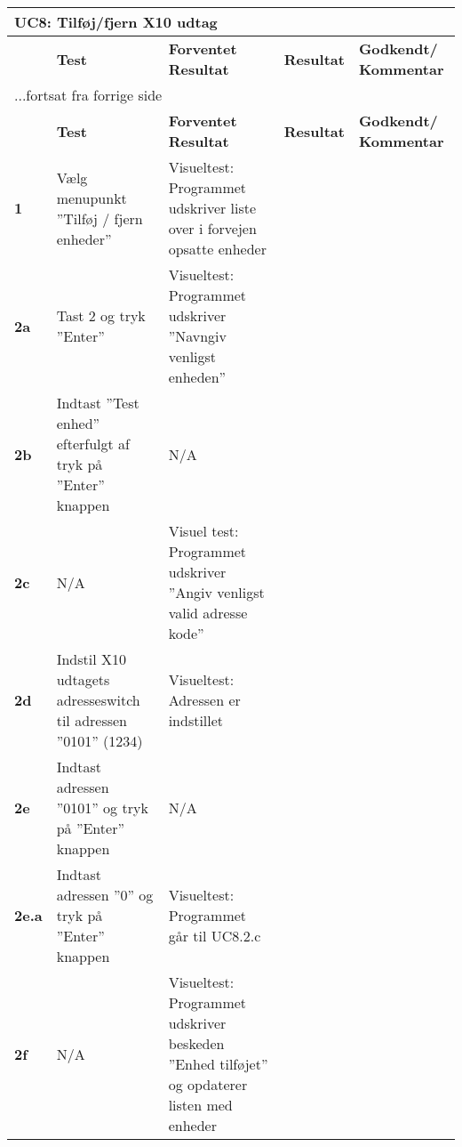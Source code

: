 
\begin{center}
\begin{longtable}{|p{}|p{}|p{}|p{}|p{}|} %
\hline
\multicolumn{5}{|l|}{\textbf{UC8: Tilføj/fjern X10 udtag}} \\ \hline
\multicolumn{1}{|c|}{} &
\textbf{Test} &
\textbf{Forventet \newline Resultat} &
\textbf{Resultat} &
\textbf{Godkendt/ \newline Kommentar} \\ \hline 
\endfirsthead

\multicolumn{5}{l}{...fortsat fra forrige side} \\ \hline 
\multicolumn{1}{|c|}{} &
\textbf{Test} &
\textbf{Forventet \newline Resultat} &
\textbf{Resultat} &
\textbf{Godkendt/ \newline Kommentar} \\ \hline 
\endhead


\textbf{1} &
Vælg menupunkt ''Tilføj / fjern enheder'' &
Visueltest: Programmet udskriver liste over i forvejen opsatte enheder &
 &
 \\\hline

\textbf{2a} &
Tast 2 og tryk ''Enter'' &
Visueltest: Programmet udskriver ''Navngiv venligst enheden'' &
 &
 \\\hline

\textbf{2b} &
Indtast ''Test enhed'' efterfulgt af tryk på ''Enter'' knappen & N/A &
 &
 \\\hline

\textbf{2c} &
N/A & Visuel test: Programmet udskriver ''Angiv venligst valid adresse kode'' &
 &
 \\\hline

\textbf{2d} &
Indstil X10 udtagets adresseswitch til adressen ''0101'' (1234) &
Visueltest: Adressen er indstillet &
 &
 \\\hline

\textbf{2e} &
Indtast adressen ''0101'' og tryk på ''Enter'' knappen &
N/A &
 &
 \\\hline

\textbf{2e.a} &
Indtast adressen ''0'' og tryk på ''Enter'' knappen &
Visueltest: Programmet går til UC8.2.c &
 &
 \\\hline

\textbf{2f} &
N/A &
Visueltest: Programmet udskriver beskeden ''Enhed tilføjet'' og opdaterer listen med enheder &
 &
 \\\hline


\end{longtable}
\end{center}
